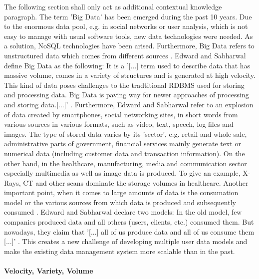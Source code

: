 The following section shall only act as additional contextual knowledge paragraph. 
The term 'Big Data' has been emerged during the past 10 years. Due to the enormous data pool, e.g. in social networks or user analysis, which is not easy to manage with usual software tools, new data technologies were needed. As a solution, NoSQL technologies have been arised. Furthermore, Big Data refers to unstructured data which comes from different sources \cite{nosql_meier}. 
Edward and Sabharwal define Big Data as the following: It is a '[...] term used to describe data that has massive volume, comes in a variety of structures and is generated at high velocity. This kind of data poses challenges to the tradtitional \ac{RDBMS} used for storing and processing data. Big Data is paving way for newer approaches of processing and storing data.[...]' \cite[p.1 ff.]{mongodb_edward}. Furthermore, Edward and Sabharwal refer to an explosion of data created by smartphones, social networking sites, in short words from various sources in various formats, such as video, text, speech, log files and images. The type of stored data varies by its 'sector', e.g. retail and whole sale, administrative parts of government, financial services mainly generate text or numerical data (including customer data and transaction information). On the other hand, in the healthcare, manufacturing, media and communication sector especially multimedia as well as image data is produced. To give an example, X-Rays, CT and other scans dominate the storage volumes in healthcare. 
Another important point, when it comes to large amounts of data is the consumation model or the various sources from which data is produced and subsequently consumed \cite[p.6 ff.]{mongodb_edward}. Edward and Sabharwal declare two models: In the old model, few companies produced data and all others (users, clients, etc.) consumed them. But nowadays, they claim that '[...] all of us produce data and all of us consume them [...]' \cite[p.6 ff.]{mongodb_edward}. This creates a new challenge of developing multiple user data models and make the existing data management system more scalable than in the past. 

\paragraph{Velocity, Variety, Volume}


